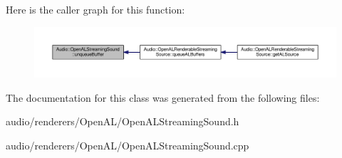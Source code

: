 Here is the caller graph for this function\+:
\nopagebreak
\begin{figure}[H]
\begin{center}
\leavevmode
\includegraphics[width=350pt]{df/d80/classAudio_1_1OpenALStreamingSound_a618fdc59cbbd807f53d4a91c65591470_icgraph}
\end{center}
\end{figure}




The documentation for this class was generated from the following files\+:\begin{DoxyCompactItemize}
\item 
audio/renderers/\+Open\+A\+L/Open\+A\+L\+Streaming\+Sound.\+h\item 
audio/renderers/\+Open\+A\+L/Open\+A\+L\+Streaming\+Sound.\+cpp\end{DoxyCompactItemize}
